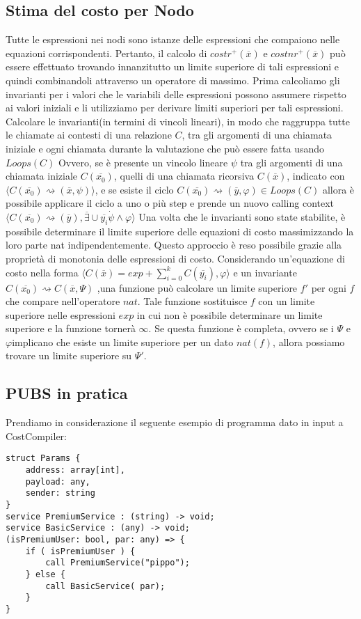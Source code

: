 \documentclass[../../main.tex]{subfiles}
\begin{document}
\subsection{Stima del costo per Nodo}
Tutte le espressioni nei nodi sono istanze delle espressioni che compaiono nelle equazioni corrispondenti. Pertanto, il calcolo di $costr^+(\overline{x})$ e $costnr^+(\overline{x})$ può essere effettuato trovando innanzitutto un limite superiore di tali espressioni e quindi combinandoli attraverso un operatore di massimo. Prima calcoliamo gli invarianti per i valori che le variabili delle espressioni possono assumere rispetto ai valori iniziali e li utilizziamo per derivare limiti superiori per tali espressioni.\\
Calcolare le invarianti(in termini di vincoli lineari), in modo che raggruppa tutte le chiamate ai contesti di una relazione $C$, tra gli argomenti di una chiamata iniziale e ogni chiamata durante la valutazione che può essere fatta usando $Loops(C)$
Ovvero, se è presente un vincolo lineare $\psi$ tra gli argomenti di una chiamata iniziale $C(\overline{x_0})$, quelli di una chiamata ricorsiva $C(\overline{x})$, indicato con $\langle C(\overline{x_0})\rightsquigarrow  (\overline{x}, \psi)\rangle$, e se esiste il ciclo $C(\overline{x_0}) \rightsquigarrow (\overline{y},\varphi)\in Loops(C)$ allora è possibile applicare il ciclo a uno o più step e prende un nuovo calling context $\langle C(\overline{x_0})  \rightsquigarrow (\overline{y}), \overline{\exists} \cup \overline{y_i}\dot \psi \land \varphi\rangle$
Una volta che le invarianti sono state stabilite, è possibile determinare il limite superiore delle equazioni di costo massimizzando la loro parte nat indipendentemente. Questo approccio è reso possibile grazie alla proprietà di monotonia delle espressioni di costo. Considerando un'equazione di costo nella forma $\langle  C(\overline{x}) = exp + \sum_{i=0}^k C(\overline{y_i}), \varphi \rangle$ e un invariante $C(\overline{x_0})\rightsquigarrow C(\overline{x}, \varPsi) $ ,una funzione può calcolare un limite superiore $f'$ per ogni $f$ che compare nell'operatore $nat$. Tale funzione sostituisce $f$ con un limite superiore nelle espressioni $exp$ in cui non è possibile determinare un limite superiore e la funzione tornerà $\infty$. Se questa funzione è completa, ovvero se i $\varPsi$ e $\varphi$implicano che esiste un limite superiore per un dato $nat(f)$, allora possiamo trovare un limite superiore su $\varPsi '$.\autocite{amslaurea3135}

\subsection{PUBS in pratica}
Prendiamo in considerazione il seguente esempio di programma dato in input a CostCompiler:
\begin{lstlisting}[caption={Listing 1}]
struct Params {
	address: array[int],
	payload: any,
	sender: string
}
service PremiumService : (string) -> void;
service BasicService : (any) -> void;
(isPremiumUser: bool, par: any) => {
	if ( isPremiumUser ) {
		call PremiumService("pippo");
	} else {
		call BasicService( par);
	}
}
\end{lstlisting}
\end{document}
